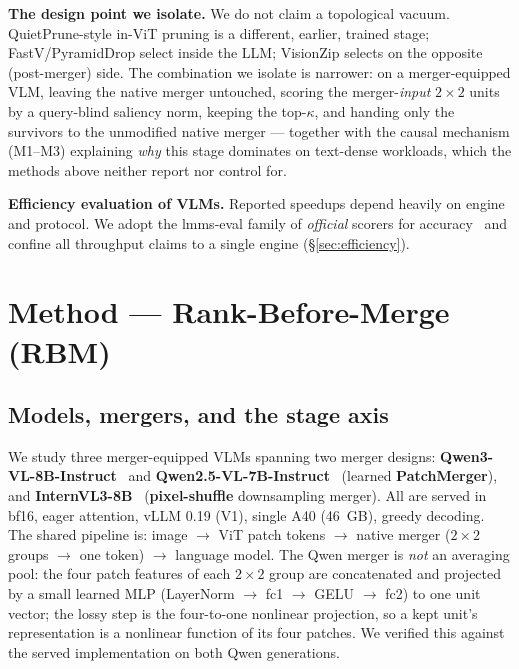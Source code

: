 \documentclass[sigconf,review,anonymous]{acmart}
\begin{document}
\textbf{The design point we isolate.} We do not claim a topological vacuum.
QuietPrune-style in-ViT pruning is a different, earlier, trained stage;
FastV/PyramidDrop select inside the LLM; VisionZip selects on the opposite
(post-merger) side. The combination we isolate is narrower: on a merger-equipped
VLM, leaving the native merger untouched, scoring the merger-\emph{input}
$2\!\times\!2$ units by a query-blind saliency norm, keeping the top-$\kappa$,
and handing only the survivors to the unmodified native merger --- together with
the causal mechanism (M1--M3) explaining \emph{why} this stage dominates on
text-dense workloads, which the methods above neither report nor control for.

\textbf{Efficiency evaluation of VLMs.} Reported speedups depend heavily on
engine and protocol. We adopt the lmms-eval family of \emph{official} scorers
for accuracy~\cite{zhang2024lmmseval} and confine all throughput claims to a
single engine (\S\ref{sec:efficiency}).

\section{Method --- Rank-Before-Merge (RBM)}\label{sec:method}

\subsection{Models, mergers, and the stage axis}\label{sec:models}

We study three merger-equipped VLMs spanning two merger designs:
\textbf{Qwen3-VL-8B-Instruct}~\cite{bai2025qwen3vl} and
\textbf{Qwen2.5-VL-7B-Instruct}~\cite{bai2025qwen25vl} (learned
\textbf{PatchMerger}), and \textbf{InternVL3-8B}~\cite{zhu2025internvl3}
(\textbf{pixel-shuffle} downsampling merger). All are served in bf16, eager
attention, vLLM 0.19 (V1), single A40 (46~GB), greedy decoding. The shared
pipeline is: image $\to$ ViT patch tokens $\to$ native merger ($2\!\times\!2$
groups $\to$ one token) $\to$ language model. The Qwen merger is \emph{not} an
averaging pool: the four patch features of each $2\!\times\!2$ group are
concatenated and projected by a small learned MLP (LayerNorm $\to$ fc1 $\to$
GELU $\to$ fc2) to one unit vector; the lossy step is the four-to-one nonlinear
projection, so a kept unit's representation is a nonlinear function of its four
patches. We verified this against the served implementation on both Qwen
generations.
\end{document}
